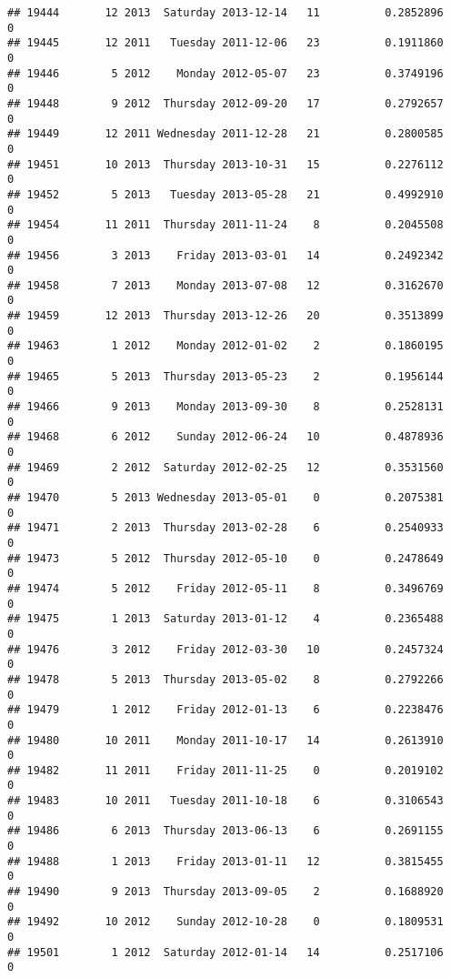 \documentclass[
]{article}
\begin{document}
\begin{verbatim}
## 19444       12 2013  Saturday 2013-12-14   11          0.2852896             0
## 19445       12 2011   Tuesday 2011-12-06   23          0.1911860             0
## 19446        5 2012    Monday 2012-05-07   23          0.3749196             0
## 19448        9 2012  Thursday 2012-09-20   17          0.2792657             0
## 19449       12 2011 Wednesday 2011-12-28   21          0.2800585             0
## 19451       10 2013  Thursday 2013-10-31   15          0.2276112             0
## 19452        5 2013   Tuesday 2013-05-28   21          0.4992910             0
## 19454       11 2011  Thursday 2011-11-24    8          0.2045508             0
## 19456        3 2013    Friday 2013-03-01   14          0.2492342             0
## 19458        7 2013    Monday 2013-07-08   12          0.3162670             0
## 19459       12 2013  Thursday 2013-12-26   20          0.3513899             0
## 19463        1 2012    Monday 2012-01-02    2          0.1860195             0
## 19465        5 2013  Thursday 2013-05-23    2          0.1956144             0
## 19466        9 2013    Monday 2013-09-30    8          0.2528131             0
## 19468        6 2012    Sunday 2012-06-24   10          0.4878936             0
## 19469        2 2012  Saturday 2012-02-25   12          0.3531560             0
## 19470        5 2013 Wednesday 2013-05-01    0          0.2075381             0
## 19471        2 2013  Thursday 2013-02-28    6          0.2540933             0
## 19473        5 2012  Thursday 2012-05-10    0          0.2478649             0
## 19474        5 2012    Friday 2012-05-11    8          0.3496769             0
## 19475        1 2013  Saturday 2013-01-12    4          0.2365488             0
## 19476        3 2012    Friday 2012-03-30   10          0.2457324             0
## 19478        5 2013  Thursday 2013-05-02    8          0.2792266             0
## 19479        1 2012    Friday 2012-01-13    6          0.2238476             0
## 19480       10 2011    Monday 2011-10-17   14          0.2613910             0
## 19482       11 2011    Friday 2011-11-25    0          0.2019102             0
## 19483       10 2011   Tuesday 2011-10-18    6          0.3106543             0
## 19486        6 2013  Thursday 2013-06-13    6          0.2691155             0
## 19488        1 2013    Friday 2013-01-11   12          0.3815455             0
## 19490        9 2013  Thursday 2013-09-05    2          0.1688920             0
## 19492       10 2012    Sunday 2012-10-28    0          0.1809531             0
## 19501        1 2012  Saturday 2012-01-14   14          0.2517106             0

\end{verbatim}
\end{document}
